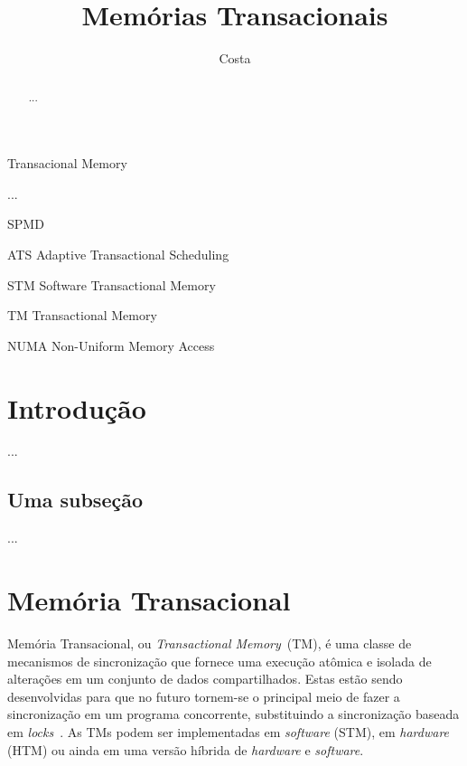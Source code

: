 \documentclass[ti]{texufpel} %
\title{Memórias Transacionais}
\author{Costa}{Michael Alexandre}
\begin{document}
\maketitle

\sloppy

\begin{abstract}
  ...
\end{abstract}

\begin{englishabstract}%
  {Transacional Memory}%

  ...
\end{englishabstract}

\listoffigures

\listoftables

\begin{listofabbrv}{SPMD}
        \item[ATS] Adaptive Transactional Scheduling
        \item[STM] Software Transactional Memory
        \item[TM] Transactional Memory
        \item[NUMA] Non-Uniform Memory Access
\end{listofabbrv}

\tableofcontents

\chapter{Introdução}

 ...

\section{Uma subseção}

  ...

\chapter{Memória Transacional}

Memória Transacional, ou \emph{Transactional Memory}~(TM), é uma classe de mecanismos de sincronização que fornece uma execução atômica e isolada de alterações em um conjunto de dados compartilhados. Estas estão sendo desenvolvidas para que no futuro tornem-se o principal meio de fazer a sincronização em um programa concorrente, substituindo a sincronização baseada em \emph{locks}~\cite{herlihy06}. As TMs podem ser implementadas em \emph{software} (STM), em \emph{hardware} (HTM) ou ainda em uma versão híbrida de \emph{hardware} e \emph{software}.
\end{document}
